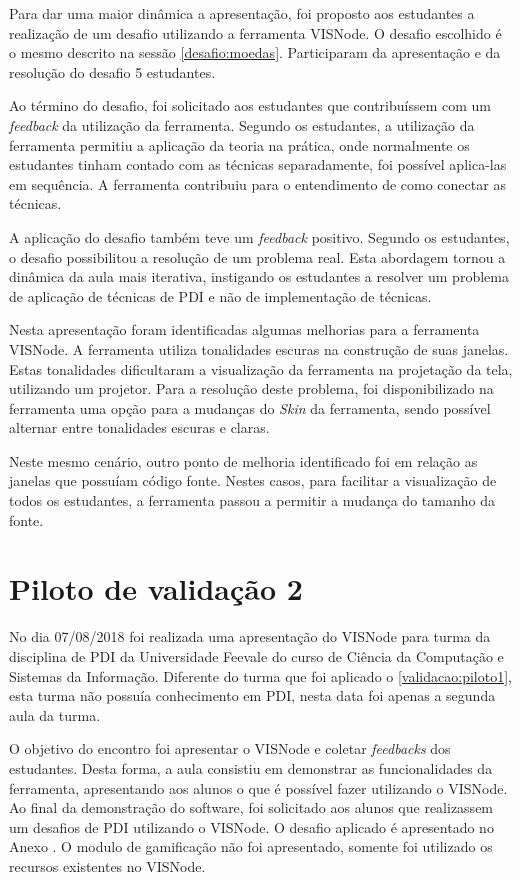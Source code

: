 \documentclass[
	12pt,				%
	oneside,			%
	a4paper,			%
	english,			%
	french,				%
	spanish,			%
	brazil,				%
	]{abntex2}
\begin{document}
Para dar uma maior dinâmica a apresentação, foi proposto aos estudantes a realização de um desafio utilizando a ferramenta VISNode. O desafio escolhido é o mesmo descrito na sessão \ref{desafio:moedas}. Participaram da apresentação e da resolução do desafio 5 estudantes.

Ao término do desafio, foi solicitado aos estudantes que contribuíssem com um \textit{feedback} da utilização da ferramenta. Segundo os estudantes, a utilização da ferramenta permitiu a aplicação da teoria na prática, onde normalmente os estudantes tinham contado com as técnicas separadamente, foi possível aplica-las em sequência. A ferramenta contribuiu para o entendimento de como conectar as técnicas.

A aplicação do desafio também teve um \textit{feedback} positivo. Segundo os estudantes, o desafio possibilitou a resolução de um problema real. Esta abordagem tornou a dinâmica da aula mais iterativa, instigando os estudantes a resolver um problema de aplicação de técnicas de PDI e não de implementação de técnicas.

Nesta apresentação foram identificadas algumas melhorias para a ferramenta VISNode. A ferramenta utiliza tonalidades escuras na construção de suas janelas. Estas tonalidades dificultaram a visualização da ferramenta na projetação da tela, utilizando um projetor. Para a resolução deste problema, foi disponibilizado na ferramenta uma opção para a mudanças do \textit{Skin} da ferramenta, sendo possível alternar entre tonalidades escuras e claras.

Neste mesmo cenário, outro ponto de melhoria identificado foi em relação as janelas que possuíam código fonte. Nestes casos, para facilitar a visualização de todos os estudantes, a ferramenta  passou a permitir a mudança do tamanho da fonte.

\section{Piloto de validação 2}

No dia 07/08/2018 foi realizada uma apresentação do VISNode para turma da disciplina de PDI da Universidade Feevale do curso de Ciência da Computação e Sistemas da Informação. Diferente do turma que foi aplicado o \ref{validacao:piloto1}, esta turma não possuía conhecimento em PDI, nesta data foi apenas a segunda aula da turma. 

O objetivo do encontro foi apresentar o VISNode e coletar \textit{feedbacks} dos estudantes. Desta forma, a aula consistiu em demonstrar as funcionalidades da ferramenta, apresentando aos alunos o que é possível fazer utilizando o VISNode. Ao final da demonstração do software, foi solicitado aos alunos que realizassem um desafios de PDI utilizando o VISNode. O desafio aplicado é apresentado no Anexo \label{desafio:estatistica}. O modulo de gamificação não foi apresentado, somente foi utilizado os recursos existentes no VISNode.
\end{document}
